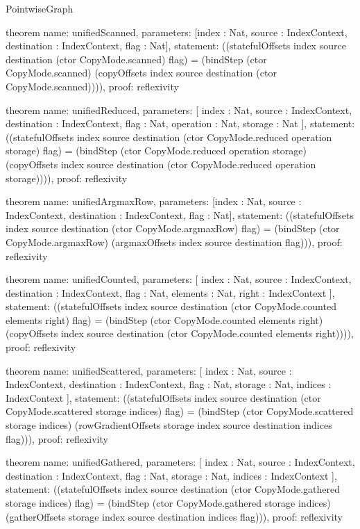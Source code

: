 \begin{lexlean}{PointwiseGraph}
\begin{semanticmodule}
theorem{
  name: unifiedScanned,
  parameters: [index : Nat, source : IndexContext, destination : IndexContext, flag : Nat],
  statement: ((statefulOffsets index source destination (ctor CopyMode.scanned) flag) = (bindStep (ctor CopyMode.scanned) (copyOffsets index source destination (ctor CopyMode.scanned)))),
  proof: reflexivity{}
}

theorem{
  name: unifiedReduced,
  parameters: [
    index : Nat,
    source : IndexContext,
    destination : IndexContext,
    flag : Nat,
    operation : Nat,
    storage : Nat
  ],
  statement: ((statefulOffsets index source destination (ctor CopyMode.reduced operation storage) flag) = (bindStep (ctor CopyMode.reduced operation storage) (copyOffsets index source destination (ctor CopyMode.reduced operation storage)))),
  proof: reflexivity{}
}

theorem{
  name: unifiedArgmaxRow,
  parameters: [index : Nat, source : IndexContext, destination : IndexContext, flag : Nat],
  statement: ((statefulOffsets index source destination (ctor CopyMode.argmaxRow) flag) = (bindStep (ctor CopyMode.argmaxRow) (argmaxOffsets index source destination flag))),
  proof: reflexivity{}
}

theorem{
  name: unifiedCounted,
  parameters: [
    index : Nat,
    source : IndexContext,
    destination : IndexContext,
    flag : Nat,
    elements : Nat,
    right : IndexContext
  ],
  statement: ((statefulOffsets index source destination (ctor CopyMode.counted elements right) flag) = (bindStep (ctor CopyMode.counted elements right) (copyOffsets index source destination (ctor CopyMode.counted elements right)))),
  proof: reflexivity{}
}

theorem{
  name: unifiedScattered,
  parameters: [
    index : Nat,
    source : IndexContext,
    destination : IndexContext,
    flag : Nat,
    storage : Nat,
    indices : IndexContext
  ],
  statement: ((statefulOffsets index source destination (ctor CopyMode.scattered storage indices) flag) = (bindStep (ctor CopyMode.scattered storage indices) (rowGradientOffsets storage index source destination indices flag))),
  proof: reflexivity{}
}

theorem{
  name: unifiedGathered,
  parameters: [
    index : Nat,
    source : IndexContext,
    destination : IndexContext,
    flag : Nat,
    storage : Nat,
    indices : IndexContext
  ],
  statement: ((statefulOffsets index source destination (ctor CopyMode.gathered storage indices) flag) = (bindStep (ctor CopyMode.gathered storage indices) (gatherOffsets storage index source destination indices flag))),
  proof: reflexivity{}
}


\end{semanticmodule}
\end{lexlean}
